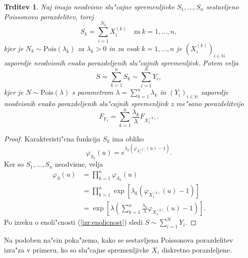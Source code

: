 \documentclass[12pt, a4paper, reqno]{amsart}
\theoremstyle{definition}
\theoremstyle{plain}
\newtheorem{trditev}[definicija]{Trditev}
\newcommand{\N}{\mathbb{N}}
\newcommand{\1}{\mathds{1}}
\newcommand{\Pois}[1]{\text{Pois}(#1)}
\begin{document}
    \begin{trditev}
        Naj imajo neodvisne slu"cajne spremenljivke $S_1, \dots, S_n$ sestavljeno Poissonovo porazdelitev, torej 
        \begin{equation*}
            S_k = \sum_{i=1}^{N_k}X_i^{(k)} \quad \text{za} \ k=1, \dots, n,
        \end{equation*}
        kjer je $N_k\sim \Pois{\lambda_k}$ za $\lambda_k > 0$ in za vsak $k = 1, \dots, n$ je $(X_i^{(k)})_{i\in\N}$ 
        zaporedje neodvisnih enako porazdeljenih slu"cajnih spremenljivk. Potem velja   
        \begin{equation*}
            S = \sum_{k=1}^nS_k \sim \sum_{i=1}^{N}Y_i,
        \end{equation*}
        kjer je $N\sim\Pois{\lambda}$ s parametrom $\lambda = \sum_{k=1}^n\lambda_k$ in $(Y_i)_{i\in\N}$ zaporedje
        neodvisnih enako porazdeljenih slu"cajnih spremenljivk z me"sano porazdelitvijo
        \begin{equation*}
        F_{Y_1} = \sum_{k=1}^n\frac{\lambda_k}{\lambda}F_{X_1^{(k)}}.
        \end{equation*}
        \label{trd:vsotaCPDjeCPD}
    \end{trditev}

    \begin{proof}
        Karakteristi"cna funkcija $S_k$ ima obliko
        \begin{equation*}
            \varphi_{S_k}(u) = e^{\lambda_k\left(\varphi_{X_1^{(k)}}(u) - 1\right)}.
        \end{equation*}
        Ker so $S_1, \dots, S_n$ neodvisne, velja
        \begin{align*}
            \varphi_{S}(u) 
                &= \prod_{k=1}^n\varphi_{S_k}(u) \\
                &= \prod_{k=1}^n\exp\left[\lambda_k\left(\varphi_{X_1^{(k)}}(u) - 1\right)\right] \\
                &= \exp\left[\lambda\left(\sum_{k=1}^n \frac{\lambda_k}{\lambda} \varphi_{X_1^{(k)}}(u) - 1\right)\right].
        \end{align*}
        Po izreku o 
        enoli"cnosti (\ref{izr:enolicnost}) sledi $S\sim\sum_{i=1}^{N}Y_i$.
    
    \end{proof}

    Na podoben na"cin poka"zemo, kako se sestavljena Poissonova porazdelitev izra"za v primeru, ko so
    slu"cajne spremenljivke $X_i$ diskretno porazdeljene.
\end{document}
